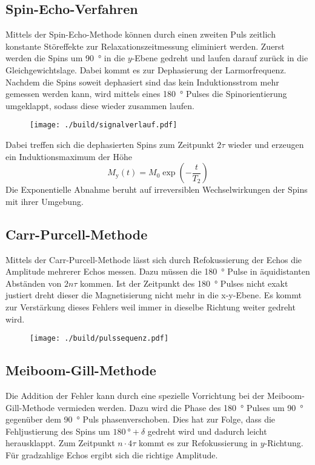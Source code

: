 \subsection{Spin-Echo-Verfahren}%
\label{sub:spin_echo_verfahren}
Mittels der Spin-Echo-Methode können durch einen zweiten Puls zeitlich
konstante Störeffekte zur Relaxationszeitmessung eliminiert werden. 
Zuerst werden die Spins um \SI{90}{\degree} in die $y$-Ebene gedreht und laufen
darauf zurück in die Gleichgewichtslage.
Dabei kommt es zur Dephasierung der Larmorfrequenz. 
Nachdem die Spins soweit dephasiert sind das kein Induktionsstrom mehr gemessen
werden kann, wird mittels eines \SI{180}{\degree} Pulses die Spinorientierung umgeklappt, 
sodass diese wieder zusammen laufen.
\begin{figure}[h]
		\centering
		\texttt{[image: ./build/signalverlauf.pdf]}
		\caption{}%
		\label{fig:sign}
\end{figure}
Dabei treffen sich die dephasierten Spins zum Zeitpunkt $2 \tau$ wieder und
erzeugen ein Induktionsmaximum der Höhe 
\begin{equation}
		\label{eq:}
		M_\text{y}(t) = M_0 \exp\left(-\frac{t}{T_2} \right)
\end{equation}
Die Exponentielle Abnahme beruht auf irreversiblen Wechselwirkungen der Spins mit
ihrer Umgebung. 

\subsection{Carr-Purcell-Methode}%
\label{sub:car_purcell}
Mittels der Carr-Purcell-Methode lässt sich durch Refokussierung der Echos die
Amplitude mehrerer Echos messen. 
Dazu müssen die \SI{180}{\degree} Pulse in äquidistanten Abständen von $2n\tau$
kommen. 
Ist der Zeitpunkt des \SI{180}{\degree} Pulses nicht exakt justiert dreht dieser die
Magnetisierung nicht mehr in die x-y-Ebene. 
Es kommt zur Verstärkung dieses Fehlers weil immer in dieselbe Richtung weiter
gedreht wird.

\begin{figure}[ht]
		\centering
		\texttt{[image: ./build/pulssequenz.pdf]}
		\caption{}%
		\label{fig:}
\end{figure}

\subsection{Meiboom-Gill-Methode}%
\label{sub:meiboom_gill_methode}
Die Addition der Fehler kann durch eine spezielle Vorrichtung bei der
Meiboom-Gill-Methode vermieden werden.
Dazu wird die Phase des \SI{180}{\degree} Pulses um \SI{90}{\degree} gegenüber
dem \SI{90}{\degree} Puls phasenverschoben.
Dies hat zur Folge, dass die Fehljustierung des Spins um $\SI{180}{\degree} 
+ \delta$ gedreht wird und dadurch leicht herausklappt. 
Zum Zeitpunkt $n \cdot 4 \tau$ kommt es zur Refokussierung in $y$-Richtung.
Für gradzahlige Echos ergibt sich die richtige Amplitude.

